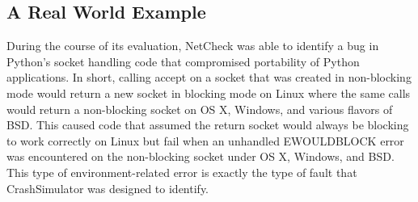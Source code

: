     \subsection{A Real World Example}

        During the course of its evaluation, NetCheck was able to identify a bug in Python's socket handling code that
        compromised portability of Python applications. In short, calling accept on a socket that was created in
        non-blocking mode would return a new socket in blocking mode on Linux where the same calls would return a
        non-blocking socket on OS X, Windows, and various flavors of BSD. This caused code that assumed the return
        socket would always be blocking to work correctly on Linux but fail when an unhandled EWOULDBLOCK error was
        encountered on the non-blocking socket under OS X, Windows, and BSD. This type of environment-related error is
        exactly the type of fault that CrashSimulator was designed to identify.
